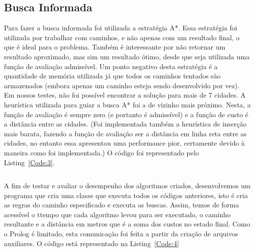 \documentclass[12pt,a4paper]{article}
\begin{document}
\subsection{Busca Informada}
Para fazer a busca informada foi utilizada a estratégia A*. Essa estratégia foi utilizada por trabalhar com caminhos, e não apenas com um resultado final, o que é ideal para o problema. Também é interessante por não retornar um resultado aproximado, mas sim um resultado ótimo, desde que seja utilizada uma função de avaliação admissível. 
	Um ponto negativo desta estratégia é a quantidade de memória utilizada já que todos os caminhos tentados são armazenados (embora apenas um caminho esteja sendo desenvolvido por vez). Em nossos testes, não foi possível encontrar a solução para mais de 7 cidades.
  A heurística utilizada para guiar a busca A* foi a de vizinho mais próximo. Nesta, a função de avaliação é sempre zero (e portanto é admissível) e a função de custo é a distância entre as cidades. (Foi implementada também a heurística de inserção mais barata, fazendo a função de avaliação ser a distância em linha reta entre as cidades, no entanto essa apresentou uma performance pior, certamente devido à maneira como foi implementada.)
  O código foi representado pelo Listing~\ref{Code:3}.

  \begin{mdframed}[linecolor=black, topline=true, bottomline=true,
  leftline=false, rightline=false, backgroundcolor=yellow!10!white]
\inputminted[tabsize=2,linenos=true,fontsize=\footnotesize,breaklines=true,breakafter=format]{prolog}{../buscaInformada_A.pl}
\end{mdframed}
  \label{Code:3}

A fim de testar e avaliar o desempenho dos algoritmos criados, desenvolvemos um programa que cria uma classe que executa todos os códigos anteriores, isto é cria as regras do caminho especificado e executa as buscas. Assim, temos de forma acessível o ttempo que cada algoritmo levou para ser executado, o caminho resultante e a distância em metros que é a soma dos custos no estado final. Como o Prolog é limitado, esta comunicação foi feita a partir da criação de arquivos auxiliares. O código está representado na Listing~\ref{Code:4}

  \begin{mdframed}[linecolor=black, topline=true, bottomline=true,leftline=false, rightline=false, backgroundcolor=yellow!10!white]
\inputminted[tabsize=2,linenos=true,fontsize=\footnotesize,breaklines=true,breakafter=format]{python}{../PrologIO.py}
\end{mdframed}
  \label{Code:4}
\end{document}
